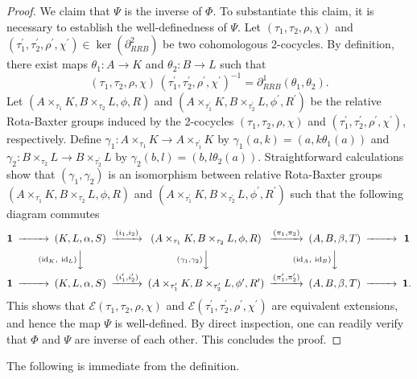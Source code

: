 \documentclass[11pt]{amsart}
\theoremstyle{thrm}
\theoremstyle{plain}
\theoremstyle{definition}
\newcommand{\Id}{\operatorname{id}}
\newcommand{\Ker}{\operatorname{ker} }
\numberwithin{equation}{section}
\begin{document}
\begin{proof}
We claim  that $\Psi$ is the inverse of $\Phi$. To substantiate this claim, it is necessary to establish the well-definedness of $\Psi$. Let $(\tau_1, \tau_2, \rho, \chi )$ and $(\tau^\prime_1, \tau^\prime_2, \rho^\prime, \chi^\prime ) \in \Ker(\partial_{RRB}^2)$ be two cohomologous 2-cocycles. By definition, there exist  maps $\theta_1: A \rightarrow K$ and $\theta_2: B \rightarrow L$ such that
$$(\tau_1, \tau_2, \rho, \chi ) \, (\tau^\prime_1, \tau^\prime_2, \rho^\prime, \chi^\prime )^{-1}=\partial^1_{RRB}(\theta_1, \theta_2).$$
Let $(A\times_{\tau_1} K,B \times_{\tau_2} L, \phi, R)$ and $(A\times_{\tau^\prime_1} K,B \times_{\tau^\prime_2} L, \phi^\prime, R^\prime)$ be the relative Rota-Baxter groups induced by the 2-cocycles $(\tau_1, \tau_2, \rho, \chi )$ and $(\tau^\prime_1, \tau^\prime_2, \rho^\prime, \chi^\prime )$, respectively. Define $\gamma_1: A \times_{\tau_1} K \rightarrow A \times_{\tau^{\prime}_1} K$ by $\gamma_1(a,k) = (a, k\theta_1(a))$ and $\gamma_2: B \times_{\tau_2} L \rightarrow B \times_{\tau^{\prime}_2} L$ by $\gamma_2(b,l) = (b, l\theta_2(a))$. Straightforward calculations show that $(\gamma_1, \gamma_2)$ is an isomorphism between relative Rota-Baxter groups $(A\times_{\tau_1} K,B \times_{\tau_2} L, \phi, R)$ and $(A\times_{\tau^\prime_1} K,B \times_{\tau^\prime_2} L, \phi^\prime, R^\prime)$ such that the following diagram commutes
 \begin{align*}
 	\begin{CD}
 		{\bf 1} @>>> (K,L,\alpha,S ) @>(i_1, i_2)>> (A\times_{\tau_1} K,B \times_{\tau_2} L, \phi, R) @>{{(\pi_1, \pi_2)} }>> (A,B, \beta, T) @>>> {\bf 1}\\ 
 		&& @V{(\Id_K, ~\Id_L)} VV@V{(\gamma_1, \gamma_2)} VV @V{(\Id_A, ~\Id_B) }VV \\
 		{\bf 1} @>>> (K,L,\alpha,S ) @>(i^\prime_1, i^\prime_2)>>(A\times_{\tau^\prime_1} K,B \times_{\tau^\prime_2} L, \phi^\prime, R^\prime)@>{(\pi^\prime_1, \pi^\prime_2) }>> (A,B, \beta, T) @>>> {\bf 1}.
 	\end{CD}
 \end{align*}
This shows that  $\mathcal{E}(\tau_1, \tau_2, \rho, \chi)$ and $\mathcal{E}(\tau^\prime_1, \tau^\prime_2, \rho^\prime, \chi^\prime)$ are equivalent extensions, and hence the map $\Psi$ is well-defined. By direct inspection, one can readily verify that  $\Phi$ and $\Psi$ are inverse of each other. This concludes the proof.
\end{proof}

The following is immediate from the definition.
\end{document}
